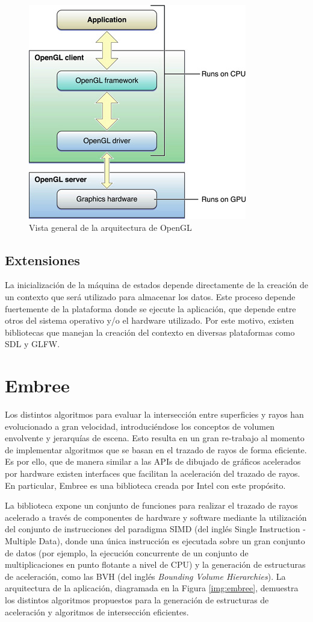 \vspace{5mm}
\begin{figure}[h]
	\centering
	\includegraphics[width=.4\linewidth]{assets/cpu_gpu}
	\caption{Vista general de la arquitectura de OpenGL}
	\label{img:gpucpugl}
 \end{figure}

\subsection{Extensiones}
La inicialización de la máquina de estados depende directamente de la creación de un contexto que será utilizado para almacenar los datos. Este proceso depende fuertemente de la plataforma donde se ejecute la aplicación, que depende entre otros del sistema operativo y/o el hardware utilizado. Por este motivo, existen bibliotecas que manejan la creación del contexto en diversas plataformas como SDL y GLFW.
	
\section{Embree}

Los distintos algoritmos para evaluar la intersección entre superficies y rayos han evolucionado a gran velocidad, introduciéndose los conceptos de volumen envolvente y jerarquías de escena. Esto resulta en un gran re-trabajo al momento de implementar algoritmos que se basan en el trazado de rayos de forma eficiente. Es por ello, que de manera similar a las APIs de dibujado de gráficos acelerados por hardware existen interfaces que facilitan la aceleración del trazado de rayos. En particular, Embree es una biblioteca creada por Intel con este propósito.

La biblioteca expone un conjunto de funciones para realizar el trazado de rayos acelerado a través de componentes de hardware y software mediante la utilización del conjunto de instrucciones del paradigma SIMD (del inglés Single Instruction - Multiple Data), donde una única instrucción es ejecutada sobre un gran conjunto de datos (por ejemplo, la ejecución concurrente de un conjunto de multiplicaciones en punto flotante a nivel de CPU) y la generación de estructuras de aceleración, como las BVH (del inglés \textit{Bounding Volume Hierarchies}). La arquitectura de la aplicación, diagramada en la Figura \ref{img:embree}, demuestra los distintos algoritmos propuestos para la generación de estructuras de aceleración y algoritmos de intersección eficientes.

